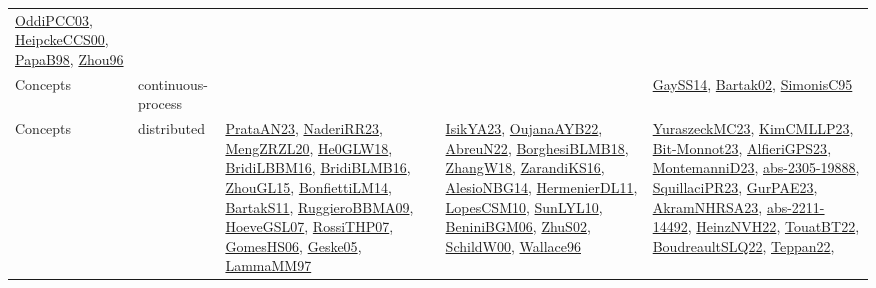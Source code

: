 {\begin{longtable}{lp{3cm}>{\raggedright}p{6cm}>{\raggedright}p{6cm}p{8cm}}
\href{papers/OddiPCC03.pdf}{OddiPCC03}\cite{OddiPCC03}, \href{articles/HeipckeCCS00.pdf}{HeipckeCCS00}\cite{HeipckeCCS00}, \href{articles/PapaB98.pdf}{PapaB98}\cite{PapaB98}, \href{papers/Zhou96.pdf}{Zhou96}\cite{Zhou96}\\
Concepts & continuous-process &  &  & \href{papers/GaySS14.pdf}{GaySS14}\cite{GaySS14}, \href{papers/Bartak02.pdf}{Bartak02}\cite{Bartak02}, \href{papers/SimonisC95.pdf}{SimonisC95}\cite{SimonisC95}\\
Concepts & distributed & \href{articles/PrataAN23.pdf}{PrataAN23}\cite{PrataAN23}, \href{articles/NaderiRR23.pdf}{NaderiRR23}\cite{NaderiRR23}, \href{articles/MengZRZL20.pdf}{MengZRZL20}\cite{MengZRZL20}, \href{papers/He0GLW18.pdf}{He0GLW18}\cite{He0GLW18}, \href{papers/BridiLBBM16.pdf}{BridiLBBM16}\cite{BridiLBBM16}, \href{articles/BridiBLMB16.pdf}{BridiBLMB16}\cite{BridiBLMB16}, \href{papers/ZhouGL15.pdf}{ZhouGL15}\cite{ZhouGL15}, \href{papers/BonfiettiLM14.pdf}{BonfiettiLM14}\cite{BonfiettiLM14}, \href{articles/BartakS11.pdf}{BartakS11}\cite{BartakS11}, \href{articles/RuggieroBBMA09.pdf}{RuggieroBBMA09}\cite{RuggieroBBMA09}, \href{papers/HoeveGSL07.pdf}{HoeveGSL07}\cite{HoeveGSL07}, \href{papers/RossiTHP07.pdf}{RossiTHP07}\cite{RossiTHP07}, \href{papers/GomesHS06.pdf}{GomesHS06}\cite{GomesHS06}, \href{papers/Geske05.pdf}{Geske05}\cite{Geske05}, \href{articles/LammaMM97.pdf}{LammaMM97}\cite{LammaMM97} & \href{articles/IsikYA23.pdf}{IsikYA23}\cite{IsikYA23}, \href{papers/OujanaAYB22.pdf}{OujanaAYB22}\cite{OujanaAYB22}, \href{articles/AbreuN22.pdf}{AbreuN22}\cite{AbreuN22}, \href{articles/BorghesiBLMB18.pdf}{BorghesiBLMB18}\cite{BorghesiBLMB18}, \href{articles/ZhangW18.pdf}{ZhangW18}\cite{ZhangW18}, \href{articles/ZarandiKS16.pdf}{ZarandiKS16}\cite{ZarandiKS16}, \href{papers/AlesioNBG14.pdf}{AlesioNBG14}\cite{AlesioNBG14}, \href{papers/HermenierDL11.pdf}{HermenierDL11}\cite{HermenierDL11}, \href{articles/LopesCSM10.pdf}{LopesCSM10}\cite{LopesCSM10}, \href{papers/SunLYL10.pdf}{SunLYL10}\cite{SunLYL10}, \href{papers/BeniniBGM06.pdf}{BeniniBGM06}\cite{BeniniBGM06}, \href{papers/ZhuS02.pdf}{ZhuS02}\cite{ZhuS02}, \href{articles/SchildW00.pdf}{SchildW00}\cite{SchildW00}, \href{articles/Wallace96.pdf}{Wallace96}\cite{Wallace96} & \href{papers/YuraszeckMC23.pdf}{YuraszeckMC23}\cite{YuraszeckMC23}, \href{papers/KimCMLLP23.pdf}{KimCMLLP23}\cite{KimCMLLP23}, \href{papers/Bit-Monnot23.pdf}{Bit-Monnot23}\cite{Bit-Monnot23}, \href{articles/AlfieriGPS23.pdf}{AlfieriGPS23}\cite{AlfieriGPS23}, \href{articles/MontemanniD23.pdf}{MontemanniD23}\cite{MontemanniD23}, \href{articles/abs-2305-19888.pdf}{abs-2305-19888}\cite{abs-2305-19888}, \href{papers/SquillaciPR23.pdf}{SquillaciPR23}\cite{SquillaciPR23}, \href{articles/GurPAE23.pdf}{GurPAE23}\cite{GurPAE23}, \href{articles/AkramNHRSA23.pdf}{AkramNHRSA23}\cite{AkramNHRSA23}, \href{articles/abs-2211-14492.pdf}{abs-2211-14492}\cite{abs-2211-14492}, \href{articles/HeinzNVH22.pdf}{HeinzNVH22}\cite{HeinzNVH22}, \href{papers/TouatBT22.pdf}{TouatBT22}\cite{TouatBT22}, \href{papers/BoudreaultSLQ22.pdf}{BoudreaultSLQ22}\cite{BoudreaultSLQ22}, \href{papers/Teppan22.pdf}{Teppan22}\cite{Teppan22}, 
\end{longtable}}
